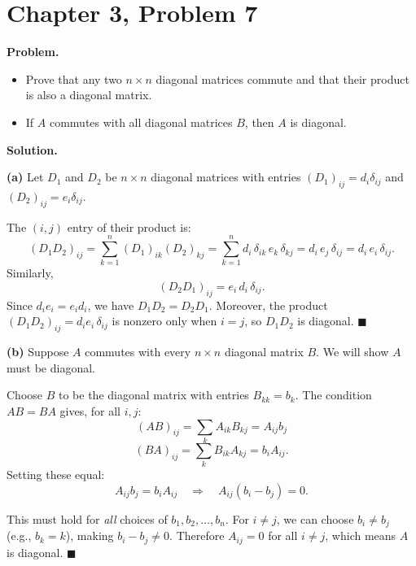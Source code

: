 \documentclass[12pt]{article}
\begin{document}
\section*{Chapter 3, Problem 7}

\textbf{Problem.}
\begin{itemize}
    \item[(a)] Prove that any two $n \times n$ diagonal matrices commute and that their product is also a diagonal matrix.
    \item[(b)] If $A$ commutes with all diagonal matrices $B$, then $A$ is diagonal.
\end{itemize}

\bigskip
\textbf{Solution.}

\textbf{(a)} Let $D_1$ and $D_2$ be $n\times n$ diagonal matrices with entries $(D_1)_{ij} = d_i \delta_{ij}$ and $(D_2)_{ij} = e_i \delta_{ij}$.

The $(i,j)$ entry of their product is:
\[
(D_1 D_2)_{ij} = \sum_{k=1}^{n} (D_1)_{ik}(D_2)_{kj} = \sum_{k=1}^{n} d_i\,\delta_{ik}\,e_k\,\delta_{kj} = d_i\, e_j\, \delta_{ij} = d_i\, e_i\, \delta_{ij}.
\]
Similarly,
\[
(D_2 D_1)_{ij} = e_i\, d_i\, \delta_{ij}.
\]
Since $d_i e_i = e_i d_i$, we have $D_1 D_2 = D_2 D_1$. Moreover, the product $(D_1 D_2)_{ij} = d_i e_i \,\delta_{ij}$ is nonzero only when $i = j$, so $D_1 D_2$ is diagonal. \hfill $\blacksquare$

\bigskip
\textbf{(b)} Suppose $A$ commutes with every $n\times n$ diagonal matrix $B$. We will show $A$ must be diagonal.

Choose $B$ to be the diagonal matrix with entries $B_{kk} = b_k$. The condition $AB = BA$ gives, for all $i, j$:
\[
(AB)_{ij} = \sum_k A_{ik} B_{kj} = A_{ij} b_j
\]
\[
(BA)_{ij} = \sum_k B_{ik} A_{kj} = b_i A_{ij}.
\]
Setting these equal:
\[
A_{ij} b_j = b_i A_{ij} \quad \Longrightarrow \quad A_{ij}(b_i - b_j) = 0.
\]

This must hold for \emph{all} choices of $b_1, b_2, \ldots, b_n$. For $i \neq j$, we can choose $b_i \neq b_j$ (e.g., $b_k = k$), making $b_i - b_j \neq 0$. Therefore $A_{ij} = 0$ for all $i \neq j$, which means $A$ is diagonal. \hfill $\blacksquare$
\end{document}
